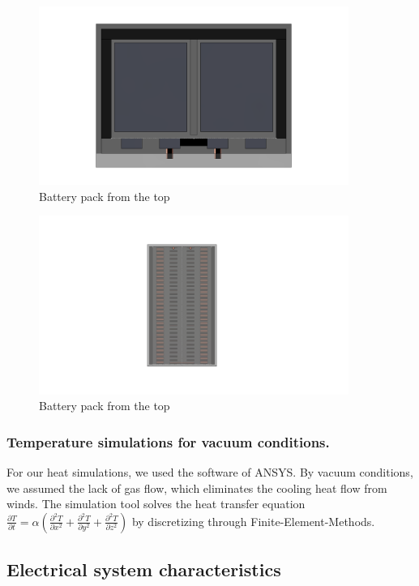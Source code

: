 \begin{figure}[h]
    \centering
    \includegraphics[width=0.9\textwidth]{texfiles/elec/eimg/BatteryAssemblySide}
    \caption{Battery pack from the top}
    \label{img: Battery pack from the side}
\end{figure}
\begin{figure}[h]
    \centering
    \includegraphics[width=0.9\textwidth]{texfiles/elec/eimg/BatteryAssemblyTop}
    \caption{Battery pack from the top}
    \label{img: Battery pack from the top}
\end{figure}
\subsubsection{Temperature simulations for vacuum conditions.}
For our heat simulations, we used the software of ANSYS. By vacuum conditions, we assumed the
lack of gas flow, which eliminates the cooling heat flow from winds. The simulation tool solves
the heat transfer equation \( \frac{\partial T}{\partial t} = \alpha \left( \frac{\partial^2 T}{\partial x^2} + \frac{\partial^2 T}{\partial y^2} + \frac{\partial^2 T}{\partial z^2} \right) \)
by discretizing through Finite-Element-Methods.
\subsection{Electrical system characteristics}
